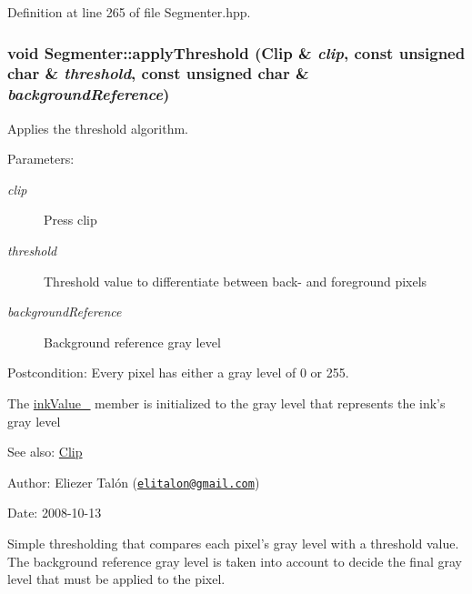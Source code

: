 Definition at line 265 of file Segmenter.hpp.\hypertarget{class_segmenter_6854315e3320f9d9a8ece14cbb8570ee}{
\subsubsection[applyThreshold]{\setlength{\rightskip}{0pt plus 5cm}void Segmenter::applyThreshold ({\bf Clip} \& {\em clip}, \/  const unsigned char \& {\em threshold}, \/  const unsigned char \& {\em backgroundReference})}}
\label{class_segmenter_6854315e3320f9d9a8ece14cbb8570ee}


Applies the threshold algorithm. 

\begin{Desc}
\item[Parameters:]
\begin{description}
\item[{\em clip}]Press clip \item[{\em threshold}]Threshold value to differentiate between back- and foreground pixels \item[{\em backgroundReference}]Background reference gray level\end{description}
\end{Desc}
\begin{Desc}
\item[Postcondition:]Every pixel has either a gray level of 0 or 255. 

The \hyperlink{class_segmenter_fa6183f99aa6011399783652b341a43b}{inkValue\_\-} member is initialized to the gray level that represents the ink's gray level\end{Desc}
\begin{Desc}
\item[See also:]\hyperlink{class_clip}{Clip}\end{Desc}
\begin{Desc}
\item[Author:]Eliezer Talón (\href{mailto:elitalon@gmail.com}{\tt elitalon@gmail.com}) \end{Desc}
\begin{Desc}
\item[Date:]2008-10-13\end{Desc}
Simple thresholding that compares each pixel's gray level with a threshold value. The background reference gray level is taken into account to decide the final gray level that must be applied to the pixel. 

